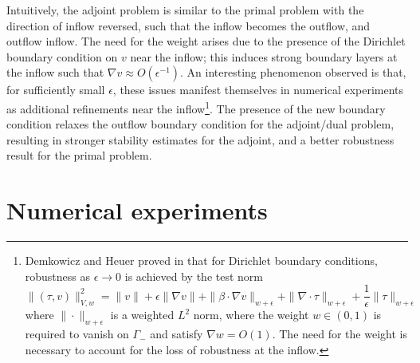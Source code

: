 \documentclass[11pt,onecolumn]{scrartcl}
\newcommand{\grad}{\nabla}
\renewcommand{\div}{\grad \cdot}
\begin{document}
Intuitively, the adjoint problem is similar to the primal problem with the direction of inflow reversed, such that the inflow becomes the outflow, and outflow inflow.  The need for the weight arises due to the presence of the Dirichlet boundary condition on $v$ near the inflow; this induces strong boundary layers at the inflow such that $\grad v \approx O(\epsilon^{-1})$. An interesting phenomenon observed is that, for sufficiently small $\epsilon$, these issues manifest themselves in numerical experiments as additional refinements near the inflow\footnote{Demkowicz and Heuer proved in \cite{DPGrobustness} that for Dirichlet boundary conditions, robustness as $\epsilon \rightarrow 0$ is achieved by the test norm
\[
\|\left(\tau, v\right)\|_{V,w}^2 = \|v\| + \epsilon \|\grad v\| + \|\beta \cdot \grad v\|_{w+\epsilon} + \| \div \tau\|_{w+\epsilon} + \frac{1}{\epsilon}\|\tau\|_{w+\epsilon}
\]
where $\|\cdot \|_{w+\epsilon}$ is a weighted $L^2$ norm, where the weight $w \in (0,1)$ is required to vanish on $\Gamma_-$ and satisfy $\grad w = O(1)$. The need for the weight is necessary to account for the loss of robustness at the inflow.}.  The presence of the new boundary condition relaxes the outflow boundary condition for the adjoint/dual problem, resulting in stronger stability estimates for the adjoint, and a better robustness result for the primal problem.  




\section{Numerical experiments}
\end{document}
